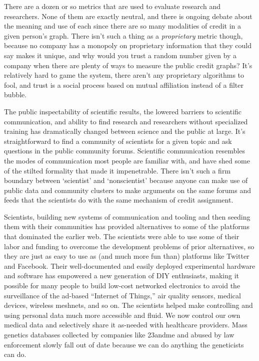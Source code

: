 There are a dozen or so metrics that are used to evaluate research and
researchers. None of them are exactly neutral, and there is ongoing
debate about the meaning and use of each since there are so many
modalities of credit in a given person's graph. There isn't such a thing
as a \emph{proprietary} metric though, because no company has a monopoly
on proprietary information that they could say makes it unique, and why
would you trust a random number given by a company when there are plenty
of ways to measure the public credit graphs? It's relatively hard to
game the system, there aren't any proprietary algorithms to fool, and
trust is a social process based on mutual affiliation instead of a
filter bubble.

The public inspectability of scientific results, the lowered barriers to
scientific communication, and ability to find research and researchers
without specialized training has dramatically changed between science
and the public at large. It's straightforward to find a community of
scientists for a given topic and ask questions in the public community
forums. Scientific communication resembles the modes of communication
most people are familiar with, and have shed some of the stilted
formality that made it impenetrable. There isn't such a firm boundary
between `scientist' and `nonscientist' because anyone can make use of
public data and community clusters to make arguments on the same forums
and feeds that the scientists do with the same mechanism of credit
assignment.

Scientists, building new systems of communication and tooling and then
seeding them with their communities has provided alternatives to some of
the platforms that dominated the earlier web. The scientists were able
to use some of their labor and funding to overcome the development
problems of prior alternatives, so they are just as easy to use as (and
much more fun than) platforms like Twitter and Facebook. Their
well-documented and easily deployed experimental hardware and software
has empowered a new generation of DIY enthusiasts, making it possible
for many people to build low-cost networked electronics to avoid the
surveillance of the ad-based ``Internet of Things,'' air quality
sensors, medical devices, wireless meshnets, and so on. The scientists
helped make controlling and using personal data much more accessible and
fluid. We now control our own medical data and selectively share it
as-needed with healthcare providers. Mass genetics databases collected
by companies like 23andme and abused by law enforcement slowly fall out
of date because we can do anything the geneticists can do.

